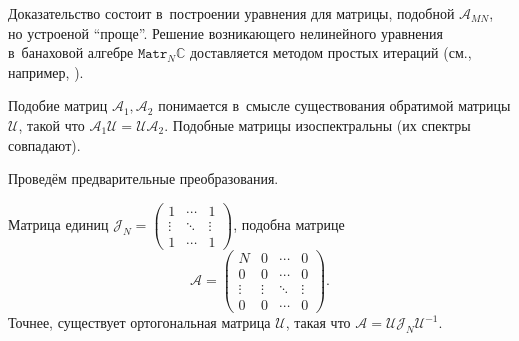 Доказательство состоит в~построении уравнения для матрицы, подобной \( \mathscr{A}_{MN} \),
 но устроеной ``проще''. Решение возникающего нелинейного уравнения
 в~банаховой алгебре \( \mathtt{Matr}_N\mathbb{C} \)
 доставляется методом простых итераций (см., например, \cite{baskakov-harmonic}).

Подобие матриц \( \mathcal{A}_1, \mathcal{A}_2 \)
 понимается в~смысле существования обратимой матрицы \( \mathcal{U} \),
 такой что \( \mathcal{A}_1 \mathcal{U} = \mathcal{U} \mathcal{A}_2 \).
Подобные матрицы изоспектральны (их спектры совпадают).

Провед\"ем предварительные преобразования.

\begin{lem}
    Матрица единиц 
    \( \mathcal{J}_N =
    \begin{pmatrix}
        1 & \cdots & 1 \\
        \vdots & \ddots & \vdots \\ 
    1 & \cdots & 1 \end{pmatrix} \),
    подобна матрице
    \[
        \mathcal{A} = \begin{pmatrix}
            N & 0 & \cdots & 0 \\
            0 & 0 & \cdots & 0 \\
            \vdots & \vdots & \ddots & \vdots \\
            0 & 0 & \cdots & 0 \end{pmatrix}. \]
    Точнее, существует ортогональная матрица \( \mathcal{U} \),
    такая что
    \( \mathcal{A} = \mathcal{U}\mathcal{J}_N \mathcal{U}^{-1} \).
\end{lem}
